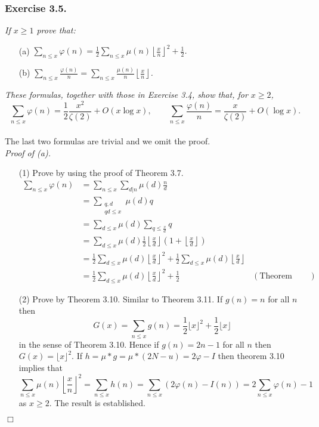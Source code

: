 \documentclass{article}
\begin{document}
\subsubsection*{Exercise 3.5.}
\emph{If $x \geq 1$ prove that:}
\begin{enumerate}
\item[(a)]
  \emph{$\sum_{n \leq x} \varphi(n)
  = \frac{1}{2} \sum_{n \leq x} \mu(n)\left\lfloor \frac{x}{n} \right\rfloor^2 + \frac{1}{2}$.}

\item[(b)]
  \emph{$\sum_{n \leq x} \frac{\varphi(n)}{n}
  = \sum_{n \leq x} \frac{\mu(n)}{n}\left\lfloor \frac{x}{n} \right\rfloor$.}
\end{enumerate}
\emph{These formulas, together with those in Exercise 3.4, show that, for $x \geq 2$,
\[
  \sum_{n \leq x} \varphi(n)
  = \frac{1}{2} \frac{x^2}{\zeta(2)} + O(x \log x),
  \qquad
  \sum_{n \leq x} \frac{\varphi(n)}{n}
  = \frac{x}{\zeta(2)} + O(\log x).
\]} \\

The last two formulas are trivial and we omit the proof. \\



\emph{Proof of (a).}
\begin{enumerate}
\item[(1)]
  Prove by using the proof of Theorem 3.7.
  \begin{align*}
    \sum_{n \leq x} \varphi(n)
    &= \sum_{n \leq x} \sum_{d|n} \mu(d) \frac{n}{d} \\
    &= \sum_{\substack{q, d \\ qd \leq x}} \mu(d) q \\
    &= \sum_{d \leq x} \mu(d) \sum_{q \leq \frac{x}{d}} q \\
    &= \sum_{d \leq x}
        \mu(d) \frac{1}{2} \left\lfloor\frac{x}{d}\right\rfloor
            \left(1 + \left\lfloor\frac{x}{d}\right\rfloor\right) \\
    &= \frac{1}{2} \sum_{d \leq x} \mu(d)\left\lfloor\frac{x}{d}\right\rfloor^2
        + \frac{1}{2} \sum_{d \leq x} \mu(d)\left\lfloor\frac{x}{d}\right\rfloor \\
    &= \frac{1}{2} \sum_{d \leq x} \mu(d)\left\lfloor\frac{x}{d}\right\rfloor^2 + \frac{1}{2}
      &(\text{Theorem 3.12})
  \end{align*}

\item[(2)]
  Prove by Theorem 3.10.
  Similar to Theorem 3.11.
  If $g(n) = n$ for all $n$ then
  \[
    G(x)
    = \sum_{n \leq x} g(n)
    = \frac{1}{2}\lfloor x \rfloor^2 + \frac{1}{2}\lfloor x \rfloor
  \]
  in the sense of Theorem 3.10.
  Hence if $g(n) = 2n - 1$ for all $n$ then $G(x) = \lfloor x \rfloor^2$.
  If $h = \mu * g = \mu * (2N - u) = 2 \varphi - I$ then
  theorem 3.10 implies that
  \[
    \sum_{n \leq x} \mu(n) \left\lfloor \frac{x}{n} \right\rfloor^2
    = \sum_{n \leq x} h(n)
    = \sum_{n \leq x} (2 \varphi(n) - I(n))
    = 2 \sum_{n \leq x} \varphi(n) - 1
  \]
  as $x \geq 2$.
  The result is established.
\end{enumerate}
$\Box$ \\
\end{document}

